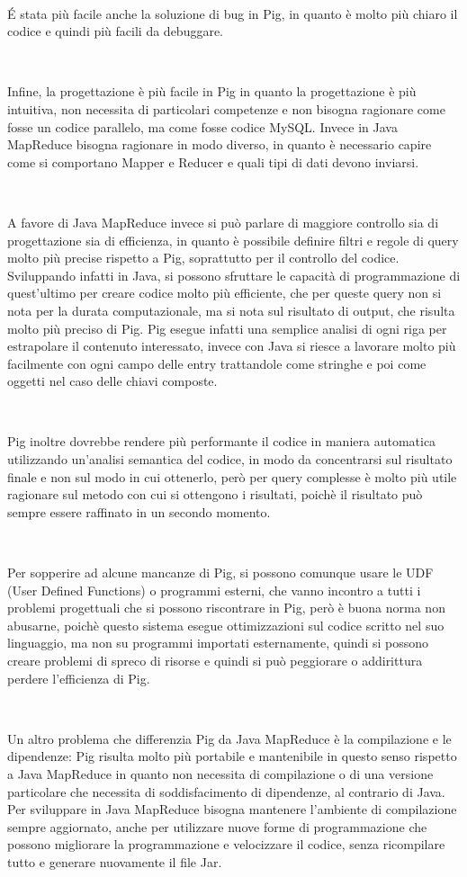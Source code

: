 \documentclass[11pt]{article} %
\begin{document}
~

\'E stata più facile anche la soluzione di bug in Pig, in quanto è molto più chiaro il codice e quindi più facili da debuggare.

~

Infine, la progettazione è più facile in Pig in quanto la progettazione è più intuitiva, non necessita di particolari competenze e non bisogna ragionare come fosse un codice parallelo, ma come fosse codice MySQL. Invece in Java MapReduce bisogna ragionare in modo diverso, in quanto è necessario capire come si comportano Mapper e Reducer e quali tipi di dati devono inviarsi.

~

A favore di Java MapReduce invece si può parlare di maggiore controllo sia di progettazione sia di efficienza, in quanto è possibile definire filtri e regole di query molto più precise rispetto a Pig, soprattutto per il controllo del codice. Sviluppando infatti in Java, si possono sfruttare le capacità di programmazione di quest'ultimo per creare codice molto più efficiente, che per queste query non si nota per la durata computazionale, ma si nota sul risultato di output, che risulta molto più preciso di Pig. Pig esegue infatti una semplice analisi di ogni riga per estrapolare il contenuto interessato, invece con Java si riesce a lavorare molto più facilmente con ogni campo delle entry trattandole come stringhe e poi come oggetti nel caso delle chiavi composte.

~

Pig inoltre dovrebbe rendere più performante il codice in maniera automatica utilizzando un'analisi semantica del codice, in modo da concentrarsi sul risultato finale e non sul modo in cui ottenerlo, però per query complesse è molto più utile ragionare sul metodo con cui si ottengono i risultati, poichè il risultato può sempre essere raffinato in un secondo momento.

~
 
Per sopperire ad alcune mancanze di Pig, si possono comunque usare le UDF (User Defined Functions) o programmi esterni, che vanno incontro a tutti i problemi progettuali che si possono riscontrare in Pig, però è buona norma non abusarne, poichè questo sistema esegue ottimizzazioni sul codice scritto nel suo linguaggio, ma non su programmi importati esternamente, quindi si possono creare problemi di spreco di risorse e quindi si può peggiorare o addirittura perdere l'efficienza di Pig.

~

Un altro problema che differenzia Pig da Java MapReduce è la compilazione e le dipendenze: Pig risulta molto più portabile e mantenibile in questo senso rispetto a Java MapReduce in quanto non necessita di compilazione o di una versione particolare che necessita di soddisfacimento di dipendenze, al contrario di Java. Per sviluppare in Java MapReduce bisogna mantenere l'ambiente di compilazione sempre aggiornato, anche per utilizzare nuove forme di programmazione che possono migliorare la programmazione e velocizzare il codice, senza ricompilare tutto e generare nuovamente il file Jar.
\end{document}
